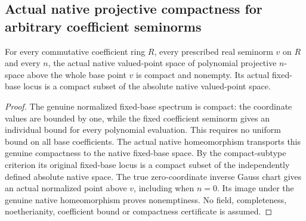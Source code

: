 \subsection{Actual native projective compactness for arbitrary coefficient seminorms}
\label{subsec:native-projective-compactness}

\begin{theorem}
\label{projective:native-fixed-base-compactness}
\leanok
{}
For every commutative coefficient ring $R$, every prescribed real
seminorm $v$ on $R$ and every $n$, the actual native valued-point space
of polynomial projective $n$-space above the whole base point $v$ is
compact and nonempty. Its actual fixed-base locus is a compact subset
of the absolute native valued-point space.
\end{theorem}
\begin{proof}
The genuine normalized fixed-base spectrum is compact: the coordinate
values are bounded by one, while the fixed coefficient seminorm gives
an individual bound for every polynomial evaluation. This requires no
uniform bound on all base coefficients. The actual native homeomorphism
transports this genuine compactness to the native fixed-base space.
By the compact-subtype criterion its original fixed-base locus is a
compact subset of the independently defined absolute native space.
The true zero-coordinate inverse Gauss chart gives an actual normalized
point above $v$, including when $n=0$. Its image under the genuine native
homeomorphism proves nonemptiness. No field, completeness, noetherianity,
coefficient bound or compactness certificate is assumed.
\end{proof}
